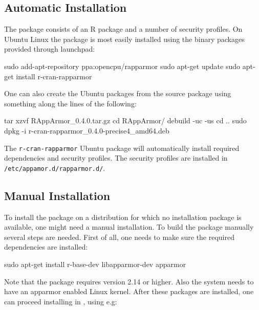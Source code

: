 \documentclass[article]{jss}
\begin{document}
\subsection{Automatic Installation}

The  package consists of an R package and a number of security
profiles. On Ubuntu Linux the package is most easily installed using the binary
packages provided through launchpad:

\begin{CodeChunk}
\begin{CodeInput}
sudo add-apt-repository ppa:opencpu/rapparmor
sudo apt-get update
sudo apt-get install r-cran-rapparmor
\end{CodeInput}
\end{CodeChunk}

One can also create the Ubuntu packages from the source  package
using something along the lines of the following:

\begin{CodeChunk}
\begin{CodeInput}
tar xzvf RAppArmor_0.4.0.tar.gz
cd RAppArmor/
debuild -uc -us
cd ..
sudo dpkg -i r-cran-rapparmor_0.4.0-precise4_amd64.deb
\end{CodeInput}
\end{CodeChunk}

The \texttt{r-cran-rapparmor} Ubuntu package will automatically install required
dependencies and security profiles. The security profiles are installed in
\texttt{/etc/appamor.d/rapparmor.d/}. 

\subsection{Manual Installation}

To install the package on a distribution for which no installation package is
available, one might need a manual installation. To build the package manually
several steps are needed. First of all, one needs to make sure the required
dependencies are installed:

\begin{CodeChunk}
\begin{CodeInput}
sudo apt-get install r-base-dev libapparmor-dev apparmor
\end{CodeInput}
\end{CodeChunk}

Note that the package requires  version 2.14 or higher. Also the
system needs to have an apparmor enabled Linux kernel. After these packages are
installed, one can proceed installing  in , using
e.g:
\end{document}
